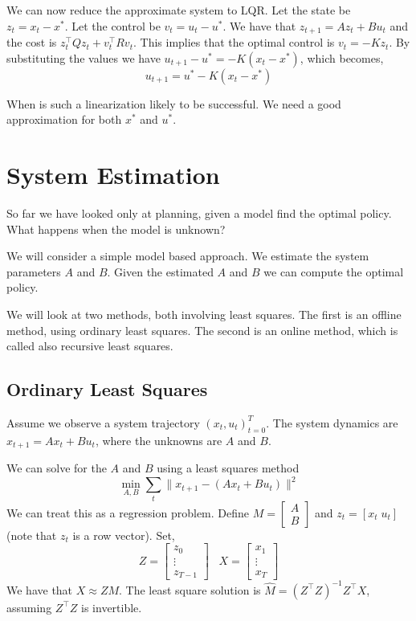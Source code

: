 We can now reduce the approximate system to LQR. Let the state be
$z_t=x_t-x^*$. Let the control be $v_t=u_t-u^*$. We have that
$z_{t+1}=Az_t + Bu_t$ and the cost is $z_t^\top Qz_t+v_t^\top Rv_t$.
This implies that the optimal control is $v_t = -Kz_t$. By
substituting the values we have $u_{t+1}-u^*=-K(x_{t}-x^*)$, which
becomes,
\[
u_{t+1}=u^*-K(x_t-x^*)
\]

When is such a linearization likely to be successful. We need a good
approximation for both $x^*$ and $u^*$.

\section{System Estimation}

So far we have looked only at planning, given a model find the
optimal policy. What happens when the model is unknown?

We will consider a simple  model based approach. We estimate the
system parameters $A$ and $B$. Given the estimated $A$ and $B$ we
can compute the optimal policy.

We will look at two methods, both involving least squares. The first
is an offline method, using ordinary least squares. The second is an
online method, which is called also recursive least squares.



\subsection{Ordinary Least Squares}

Assume we observe a system trajectory $(x_t,u_t)_{t=0}^T$. The
system dynamics are $x_{t+1}=Ax_t+B u_t$, where the unknowns are $A$
and $B$.

We can solve for the $A$ and $B$ using a least squares method
\[
\min_{A,B} \sum_t \| x_{t+1}-(Ax_t+Bu_t)  \|^2
\]
We can treat this as a regression problem. Define
$M=\begin{bmatrix}A\\ B\end{bmatrix}$ and $z_t =[x_t\; u_t]$ (note
that $z_t$ is a row vector). Set,
\[
Z=\begin{bmatrix}z_0\\ \vdots\\z_{T-1}\end{bmatrix}\;\;\; X=
\begin{bmatrix}x_1\\ \vdots\\x_{T}\end{bmatrix}
\]
We have that $X\approx Z M$. The least square solution is
$\hat{M}=(Z^\top Z)^{-1}Z^\top X$, assuming $Z^\top Z$ is
invertible.

